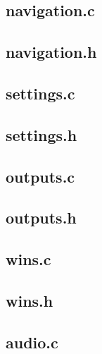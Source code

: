 \documentclass{article}
\begin{document}
    \subsection{navigation.c}
        

    \subsection{navigation.h}
        

    \subsection{settings.c}
        

    \subsection{settings.h}
        

    \subsection{outputs.c}
        

    \subsection{outputs.h}
        

    \subsection{wins.c}
        

    \subsection{wins.h}
        

    \subsection{audio.c}
        
\end{document}

